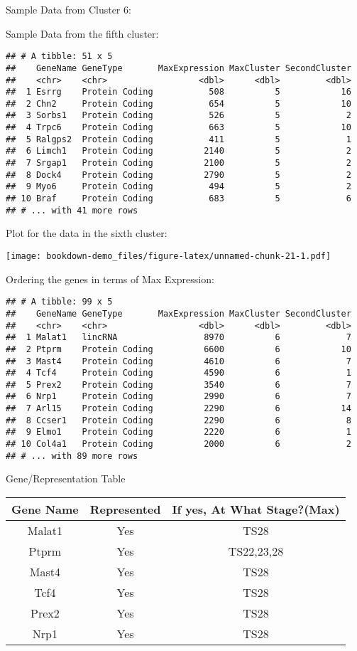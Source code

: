 \documentclass[
]{book}
\begin{document}
Sample Data from Cluster 6:

Sample Data from the fifth cluster:

\begin{verbatim}
## # A tibble: 51 x 5
##    GeneName GeneType       MaxExpression MaxCluster SecondCluster
##    <chr>    <chr>                  <dbl>      <dbl>         <dbl>
##  1 Esrrg    Protein Coding           508          5            16
##  2 Chn2     Protein Coding           654          5            10
##  3 Sorbs1   Protein Coding           526          5             2
##  4 Trpc6    Protein Coding           663          5            10
##  5 Ralgps2  Protein Coding           411          5             1
##  6 Limch1   Protein Coding          2140          5             2
##  7 Srgap1   Protein Coding          2100          5             2
##  8 Dock4    Protein Coding          2790          5             2
##  9 Myo6     Protein Coding           494          5             2
## 10 Braf     Protein Coding           683          5             6
## # ... with 41 more rows
\end{verbatim}

Plot for the data in the sixth cluster:

\texttt{[image: bookdown-demo\_files/figure-latex/unnamed-chunk-21-1.pdf]}

Ordering the genes in terms of Max Expression:

\begin{verbatim}
## # A tibble: 99 x 5
##    GeneName GeneType       MaxExpression MaxCluster SecondCluster
##    <chr>    <chr>                  <dbl>      <dbl>         <dbl>
##  1 Malat1   lincRNA                 8970          6             7
##  2 Ptprm    Protein Coding          6600          6            10
##  3 Mast4    Protein Coding          4610          6             7
##  4 Tcf4     Protein Coding          4590          6             1
##  5 Prex2    Protein Coding          3540          6             7
##  6 Nrp1     Protein Coding          2990          6             7
##  7 Arl15    Protein Coding          2290          6            14
##  8 Ccser1   Protein Coding          2290          6             8
##  9 Elmo1    Protein Coding          2220          6             1
## 10 Col4a1   Protein Coding          2000          6             2
## # ... with 89 more rows
\end{verbatim}

Gene/Representation Table

\begin{longtable}[]{@{}ccc@{}}
\toprule
Gene Name & Represented & If yes, At What Stage?(Max)\tabularnewline
\midrule
\endhead
Malat1 & Yes & TS28\tabularnewline
Ptprm & Yes & TS22,23,28\tabularnewline
Mast4 & Yes & TS28\tabularnewline
Tcf4 & Yes & TS28\tabularnewline
Prex2 & Yes & TS28\tabularnewline
Nrp1 & Yes & TS28\tabularnewline
\bottomrule
\end{longtable}
\end{document}
